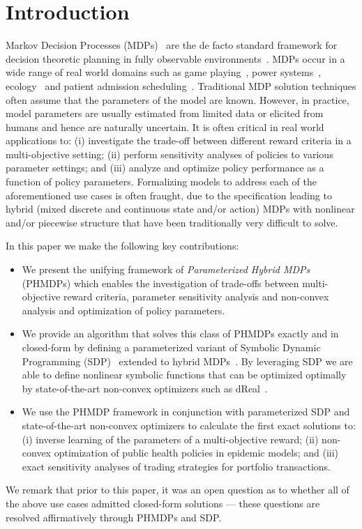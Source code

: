 \section{Introduction}
\label{sec:introduction}

Markov Decision Processes (MDPs)~\parencite{Howard_MIT_1960} are the de facto standard framework for decision theoretic planning in fully observable environments~\parencite{Boutilier_JAIR_1999}. MDPs occur in a wide range of real world domains such as game playing~\parencite{Szita_RL_2012}, power systems~\parencite{Reddy_IJCAI_2011}, ecology~\parencite{Williams_EM_2009} and patient admission scheduling~\parencite{Zhu_AIM_2014}. Traditional MDP solution techniques often assume that the parameters of the model are known. However, in practice, model parameters are usually estimated from limited data or elicited from humans and hence are naturally uncertain. It is often critical in real world applications to: (i) investigate the trade-off between different reward criteria in a multi-objective setting; (ii) perform sensitivity analyses of policies to various parameter settings; and (iii) analyze and optimize policy performance as a function of policy parameters.  Formalizing models to address each of the aforementioned use cases is often fraught, due to the specification leading to hybrid (mixed discrete and continuous state and/or action) MDPs with nonlinear and/or piecewise structure that have been traditionally very difficult to solve.

In this paper we make the following key contributions:
\begin{itemize}
\item We present the unifying framework of {\it Parameterized Hybrid MDPs} (PHMDPs) which enables the investigation of trade-offs between multi-objective reward criteria, parameter sensitivity analysis and non-convex analysis and optimization of policy parameters.

\item We provide an algorithm that solves this class of PHMDPs exactly and in closed-form by defining a parameterized variant of Symbolic Dynamic Programming (SDP)~\parencite{Boutilier_IJCAI_2001} extended to hybrid MDPs~\parencite{Sanner_UAI_2011}. By leveraging SDP we are able to define nonlinear symbolic functions that can be optimized optimally by state-of-the-art non-convex optimizers such as dReal~\parencite{Gao2013}.

\item We use the PHMDP framework in conjunction with parameterized SDP and state-of-the-art non-convex optimizers to calculate the first exact solutions to: (i) inverse learning of the parameters of a multi-objective reward; (ii) non-convex optimization of public health policies in epidemic models; and (iii) exact sensitivity analyses of trading strategies for portfolio transactions. 
\end{itemize}

We remark that prior to this paper, it was an open question as to whether all of the above use cases admitted closed-form solutions --- these questions are resolved affirmatively through PHMDPs and SDP.
